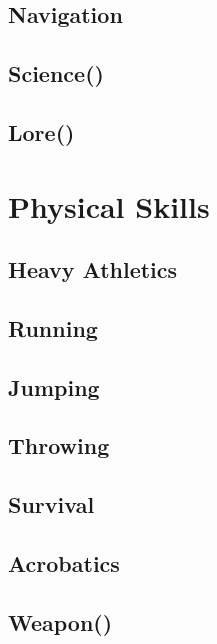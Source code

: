 \subsection{Navigation}\label{subsec:navigation}
\subsection{Science()}\label{subsec:science}
\subsection{Lore()}\label{subsec:lore}

\section{Physical Skills}\label{sec:strength-skills}
\subsection{Heavy Athletics}\label{subsec:heavy-athletics}
\subsection{Running}\label{subsec:running}
\subsection{Jumping}\label{subsec:jumping}
\subsection{Throwing}\label{subsec:throwing}
\subsection{Survival}\label{subsec:survival}
\subsection{Acrobatics}\label{subsec:acrobatics}
\subsection{Weapon()}\label{subsec:weapon}
\pagebreak
